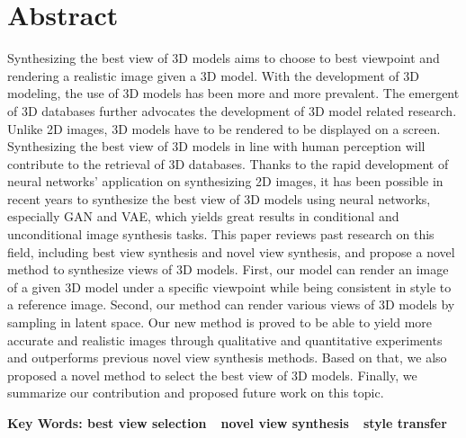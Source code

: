 \documentclass[UTF8,openany,AutoFakeBold,AutoFakeSlant,cs4size]{ctexbook}
\begin{document}
\fancyhf{}
\fancyfoot[CO,CE]{~\thepage~}
\renewcommand{\headrulewidth}{0.7pt}
\renewcommand{\footrulewidth}{0pt}
\clearpage






\small
\linespread{1.5}\selectfont
\chapter*{\bfseries Abstract}

Synthesizing the best view of 3D models aims to choose to best viewpoint and rendering a realistic image given a 3D model. With the development of 3D modeling, the use of 3D models has been more and more prevalent. The emergent of 3D databases further advocates the development of 3D model related research. Unlike 2D images, 3D models have to be rendered to be displayed on a screen. Synthesizing the best view of 3D models in line with human perception will contribute to the retrieval of 3D databases. Thanks to the rapid development of neural networks' application on synthesizing 2D images, it has been possible in recent years to synthesize the best view of 3D models using neural networks, especially GAN and VAE, which yields great results in conditional and unconditional image synthesis tasks. This paper reviews past research on this field, including best view synthesis and novel view synthesis, and propose a novel method to synthesize views of 3D models. First, our model can render an image of a given 3D model under a specific viewpoint while being consistent in style to a reference image. Second, our method can render various views of 3D models by sampling in latent space. Our new method is proved to be able to yield more accurate and realistic images through qualitative and quantitative experiments and outperforms previous novel view synthesis methods. Based on that, we also proposed a novel method to select the best view of 3D models. Finally, we summarize our contribution and proposed future work on this topic.

\bigskip
\noindent
{\bfseries Key Words: best view selection\ \ novel view synthesis\ \ style transfer}



{
	\fancyhf{}
	\fancyfoot[CO,CE]{~\thepage~}
	\renewcommand{\headrulewidth}{0.7pt}
	\renewcommand{\footrulewidth}{0pt}
}
\fancyhf{}
\fancyfoot[CO,CE]{~\thepage~}
\renewcommand{\headrulewidth}{0.7pt}
\renewcommand{\footrulewidth}{0pt}
\clearpage
\end{document}
